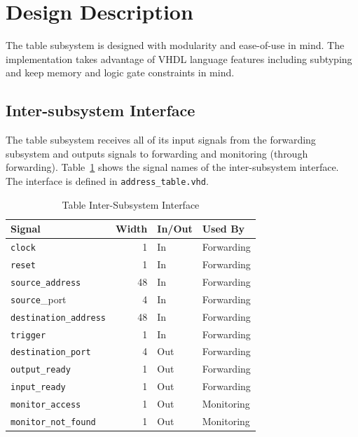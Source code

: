 \documentclass{article}
\begin{document}
\newpage

\section{Design Description}

The table subsystem is designed with modularity and ease-of-use in mind. The implementation takes advantage of VHDL language features including subtyping and keep memory and logic gate constraints in mind. 

\subsection{Inter-subsystem Interface}

The table subsystem receives all of its input signals from the forwarding subsystem and outputs signals to forwarding and monitoring (through forwarding). Table~\ref{tab:a} shows the signal names of the inter-subsystem interface. The interface is defined in \texttt{address\_table.vhd}.

\begin{table}[ht]
    \begin{center}
        \begin{tabular}{lrll}\hline
        Signal & Width & In/Out & Used By \\
        \hline
        \texttt{clock} & 1 & In & Forwarding \\
        \hline
        \texttt{reset} & 1 & In & Forwarding \\
        \hline
        \texttt{source\_address} & 48 & In & Forwarding \\
        \hline
        \texttt{source}\_port & 4 & In & Forwarding \\
        \hline
        \texttt{destination\_address} & 48 & In & Forwarding \\
        \hline
        \texttt{trigger} & 1 & In & Forwarding \\
        \hline
        \texttt{destination\_port} & 4 & Out & Forwarding \\
        \hline
        \texttt{output\_ready} & 1 & Out & Forwarding \\
        \hline
        \texttt{input\_ready} & 1 & Out & Forwarding \\
        \hline
        \texttt{monitor\_access} & 1 & Out & Monitoring \\
        \hline
        \texttt{monitor\_not\_found} & 1 & Out & Monitoring \\
        \hline
        \end{tabular}
        \caption{Table Inter-Subsystem Interface}\label{tab:a}
    \end{center}
\end{table}
\end{document}

